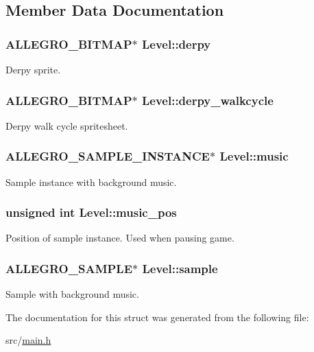 \subsection{\-Member \-Data \-Documentation}
\hypertarget{structLevel_ae33832497116b7a0c184959bbde21ee5}{
\subsubsection[{derpy}]{\setlength{\rightskip}{0pt plus 5cm}\-A\-L\-L\-E\-G\-R\-O\-\_\-\-B\-I\-T\-M\-A\-P$\ast$ {\bf \-Level\-::derpy}}}\label{structLevel_ae33832497116b7a0c184959bbde21ee5}
\-Derpy sprite. \hypertarget{structLevel_ab6a78c50cda8424f722ca249f5466f67}{
\subsubsection[{derpy\-\_\-walkcycle}]{\setlength{\rightskip}{0pt plus 5cm}\-A\-L\-L\-E\-G\-R\-O\-\_\-\-B\-I\-T\-M\-A\-P$\ast$ {\bf \-Level\-::derpy\-\_\-walkcycle}}}\label{structLevel_ab6a78c50cda8424f722ca249f5466f67}
\-Derpy walk cycle spritesheet. \hypertarget{structLevel_a41c6aae8f508e078b02c291e1d6f8e67}{
\subsubsection[{music}]{\setlength{\rightskip}{0pt plus 5cm}\-A\-L\-L\-E\-G\-R\-O\-\_\-\-S\-A\-M\-P\-L\-E\-\_\-\-I\-N\-S\-T\-A\-N\-C\-E$\ast$ {\bf \-Level\-::music}}}\label{structLevel_a41c6aae8f508e078b02c291e1d6f8e67}
\-Sample instance with background music. \hypertarget{structLevel_a13e322deb3298846260af31324e5b492}{
\subsubsection[{music\-\_\-pos}]{\setlength{\rightskip}{0pt plus 5cm}unsigned int {\bf \-Level\-::music\-\_\-pos}}}\label{structLevel_a13e322deb3298846260af31324e5b492}
\-Position of sample instance. \-Used when pausing game. \hypertarget{structLevel_a234fa7b9ec35dd360e4e3c48a944fc7d}{
\subsubsection[{sample}]{\setlength{\rightskip}{0pt plus 5cm}\-A\-L\-L\-E\-G\-R\-O\-\_\-\-S\-A\-M\-P\-L\-E$\ast$ {\bf \-Level\-::sample}}}\label{structLevel_a234fa7b9ec35dd360e4e3c48a944fc7d}
\-Sample with background music. 

\-The documentation for this struct was generated from the following file\-:\begin{DoxyCompactItemize}
\item 
src/\hyperlink{main_8h}{main.\-h}\end{DoxyCompactItemize}
